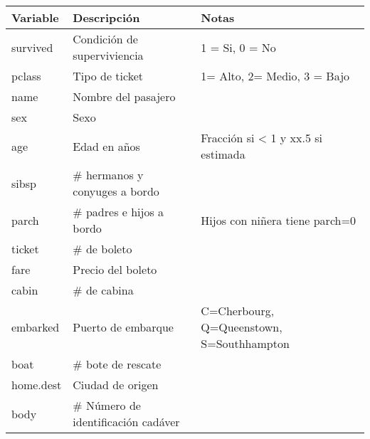 \documentclass{standalone}
\begin{document}
\begin{tabular}{lll}
  \toprule
  Variable & Descripción  & Notas \\
  \midrule
   survived & Condición de superviviencia & 1 = Si, 0 = No\\
   pclass & Tipo de ticket &  1= Alto, 2= Medio, 3 = Bajo  \\
   name & Nombre del pasajero & \\
   sex & Sexo  & \\
   age & Edad en años & Fracción si < 1 y xx.5 si estimada\\
   sibsp & \# hermanos y conyuges a bordo &  \\
   parch & \# padres e hijos a bordo &  Hijos con niñera tiene parch=0\\
   ticket & \# de boleto & \\
   fare & Precio del boleto & \\
   cabin & \# de cabina & \\
   embarked & Puerto de embarque & C=Cherbourg, Q=Queenstown, S=Southhampton\\
   boat & \# bote de rescate & \\ 
   home.dest & Ciudad de origen & \\ 
   body & \# Número de identificación cadáver \\
  \bottomrule
\end{tabular}
\end{document}
